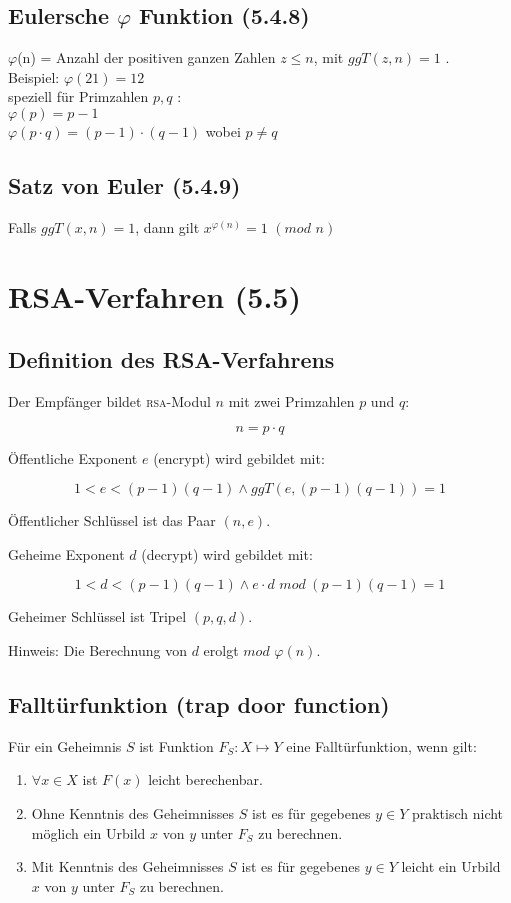 \subsection{Eulersche $\varphi$ Funktion (5.4.8)}
$\varphi$(n) = Anzahl der positiven ganzen Zahlen $z \le n$, mit $ggT(z,n) = 1$ . \\
Beispiel: $\varphi(21) = 12$ \\
speziell für Primzahlen $p, q$ : \\
$\varphi(p) = p-1$ \\
$\varphi(p \cdot q) = (p-1) \cdot (q-1)$ wobei $p \neq q$ \\

\subsection{Satz von Euler (5.4.9)}
Falls $ggT(x, n) = 1$, dann gilt  $x^{\varphi(n)} = 1 \hspace{4pt} (mod \hspace{4pt} n) $ 

\section{RSA-Verfahren (5.5)}
\subsection{Definition des RSA-Verfahrens}
Der Empfänger bildet \textsc{rsa}-Modul $n$ mit zwei Primzahlen $p$ und $q$:

$$
	n = p \cdot q
$$

Öffentliche Exponent $e$ (encrypt) wird gebildet mit:

$$
	1 < e < (p-1)(q-1) \wedge ggT(e,(p-1)(q-1)) = 1
$$

Öffentlicher Schlüssel ist das Paar $(n,e)$.

Geheime Exponent $d$ (decrypt) wird gebildet mit:

$$
	1 < d < (p-1)(q-1) \wedge e \cdot d \hspace{4pt} mod \hspace{3pt} (p-1)(q-1) = 1
$$

Geheimer Schlüssel ist Tripel $(p,q,d)$.

Hinweis: Die Berechnung von $d$ erolgt $mod \hspace{4pt} \varphi(n)$.

\subsection{Falltürfunktion (trap door function)}
 Für ein Geheimnis $S$ ist Funktion $F_S: X \mapsto Y$ eine Falltürfunktion, wenn gilt:
 \begin{enumerate}
  \item $\forall x \in X$ ist $F(x)$ leicht berechenbar.
  \item Ohne Kenntnis des Geheimnisses $S$ ist es für gegebenes $y \in Y$ praktisch nicht möglich ein Urbild $x$ von $y$ unter $F_S$ zu berechnen.
  \item Mit Kenntnis des Geheimnisses $S$ ist es für gegebenes $y \in Y$ leicht ein Urbild $x$ von $y$ unter $F_S$ zu berechnen. 
\end{enumerate}

